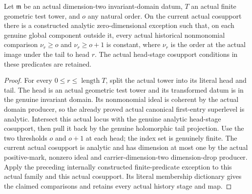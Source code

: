 \begin{theorem}
\label{hir:curve-predicates-actual-history}
\leanok
Let $\mathfrak m$ be an actual dimension-two invariant-domain datum, $T$ an
actual finite geometric test tower, and $o$ any natural order. On the current
actual cosupport there is a constructed analytic zero-dimensional exception
such that, on each genuine global component outside it, every actual
historical nonmonomial comparison $\nu_r\ge o$ and $\nu_r\ge o+1$ is constant,
where $\nu_r$ is the order at the actual image under the tail to head $r$.
The actual head-stage cosupport conditions in these predicates are retained.
\end{theorem}
\begin{proof}
For every $0\le r\le\operatorname{length}T$, split the actual tower into its
literal head and tail. The head is an actual geometric test tower and its
transformed datum is in the genuine invariant domain. Its nonmonomial ideal
is coherent by the actual domain producer, so the already proved actual
canonical first-entry superlevel is analytic. Intersect this actual locus with the genuine analytic head-stage cosupport,
then pull it back by the genuine holomorphic tail projection. Use the two thresholds $o$ and
$o+1$ at each head; the index set is genuinely finite. The current actual
cosupport is analytic and has dimension at most one by the actual positive-mark,
nonzero ideal and carrier-dimension-two dimension-drop producer. Apply the
preceding internally constructed finite-predicate exception to this actual
family and this actual cosupport. Its literal membership dictionary gives
the claimed comparisons and retains every actual history stage and map.
\end{proof}


